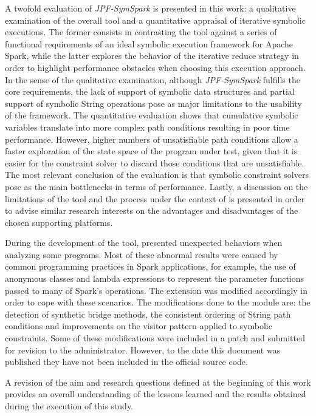 A twofold evaluation of \textit{JPF-SymSpark} is presented in this work: a qualitative examination of the overall tool and a quantitative appraisal of iterative symbolic executions. The former consists in contrasting the tool against a series of functional requirements of an ideal symbolic execution framework for Apache Spark, while the latter explores the behavior of the iterative reduce strategy in order to highlight performance obstacles when choosing this execution approach. In the sense of the qualitative examination, although \textit{JPF-SymSpark} fulfills the core requirements, the lack of support of symbolic data structures and partial support of symbolic String operations pose as major limitations to the usability of the framework. The quantitative evaluation shows that cumulative symbolic variables translate into more complex path conditions resulting in poor time performance. However, higher numbers of unsatisfiable path conditions allow a faster exploration of the state space of the program under test, given that it is easier for the constraint solver to discard those conditions that are unsatisfiable. The most relevant conclusion of the evaluation is that symbolic constraint solvers pose as the main bottlenecks in terms of performance. Lastly, a discussion on the limitations of the tool and the process under the context of \jpf{} is presented in order to advise similar research interests on the advantages and disadvantages of the chosen supporting platforms.

During the development of the tool, \spf{} presented unexpected behaviors when analyzing some programs. Most of these abnormal results were caused by common programming practices in Spark applications, for example, the use of anonymous classes and lambda expressions to represent the parameter functions passed to many of Spark's operations. The \spf{} extension was modified accordingly in order to cope with these scenarios. The modifications done to the \spf{} module are: the detection of synthetic bridge methods, the consistent ordering of String path conditions and improvements on the visitor pattern applied to symbolic constraints. Some of these modifications were included in a patch and submitted for revision to the \spf{} administrator. However, to the date this document was published they have not been included in the official source code.


A revision of the aim and research questions defined at the beginning of this work provides an overall understanding of the lessons learned and the results obtained during the execution of this study.

